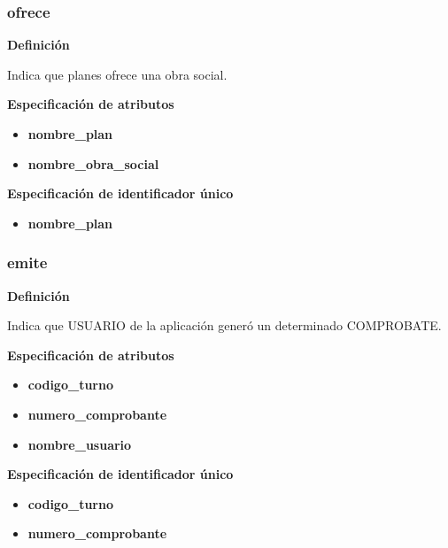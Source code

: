 \documentclass[a4paper,11pt]{article}
\begin{document}
\subsubsection{\textbf{ofrece}}

\textbf{Definición}

Indica que planes ofrece una obra social.

\textbf{Especificación de atributos}


\begin{itemize}
     \item \textbf{nombre\_plan}

     \item \textbf{nombre\_obra\_social}


\end{itemize}

\textbf{Especificación de identificador único}

\begin{itemize}

    \item \textbf{nombre\_plan}


\end{itemize}


\subsubsection{\textbf{emite}}

\textbf{Definición}

Indica que USUARIO de la aplicación generó un determinado COMPROBATE.

\textbf{Especificación de atributos}


\begin{itemize}
     \item \textbf{codigo\_turno}

     \item \textbf{numero\_comprobante}

     \item \textbf{nombre\_usuario}


\end{itemize}

\textbf{Especificación de identificador único}

\begin{itemize}

     \item \textbf{codigo\_turno}

     \item \textbf{numero\_comprobante}


\end{itemize}
\end{document}
